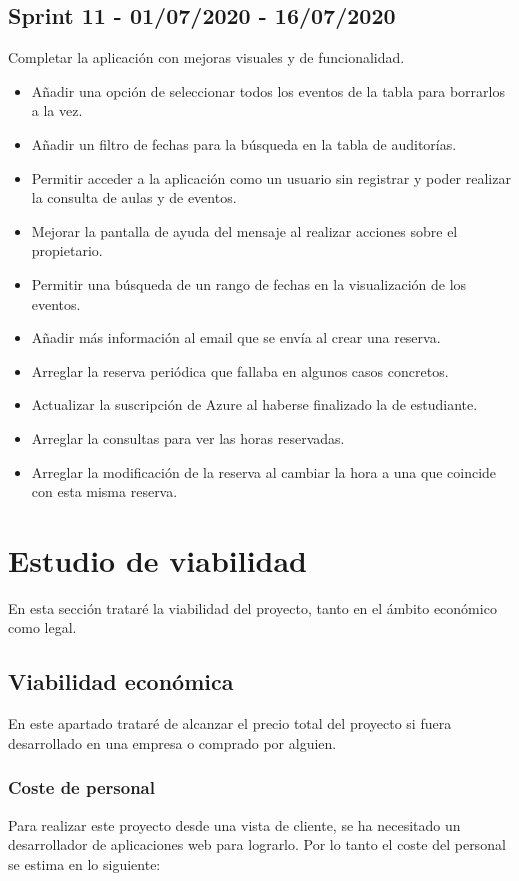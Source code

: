 \subsection{Sprint 11 - 01/07/2020 - 16/07/2020 }
Completar la aplicación con mejoras visuales y de funcionalidad.
\begin{itemize}
    \item Añadir una opción de seleccionar todos los eventos de la tabla para borrarlos a la vez.
    \item Añadir un filtro de fechas para la búsqueda en la tabla de auditorías.
    \item Permitir acceder a la aplicación como un usuario sin registrar y poder realizar la consulta de aulas y de eventos.
    \item Mejorar la pantalla de ayuda del mensaje al realizar acciones sobre el propietario.
    \item Permitir una búsqueda de un rango de fechas en la visualización de los eventos.
    \item Añadir más información al email que se envía al crear una reserva.
    \item Arreglar la reserva periódica que fallaba en algunos casos concretos.
    \item Actualizar la suscripción de Azure al haberse finalizado la de estudiante.
    \item Arreglar la consultas para ver las horas reservadas.
    \item Arreglar la modificación de la reserva al cambiar la hora a una que coincide con esta misma reserva.
\end{itemize}
\section{Estudio de viabilidad}
En esta sección trataré la viabilidad del proyecto, tanto en el ámbito económico como legal.
\subsection{Viabilidad económica}
En este apartado trataré de alcanzar el precio total del proyecto si fuera desarrollado en una empresa o comprado por alguien.\newline
\subsubsection{Coste de personal}
Para realizar este proyecto desde una vista de cliente, se ha necesitado un desarrollador de aplicaciones web para lograrlo. Por lo tanto el coste del personal se estima en lo siguiente:\newline
